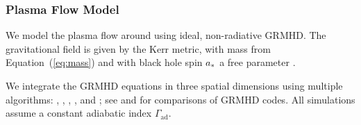 \subsubsection{Plasma Flow Model}

We model the plasma flow around \sgra using ideal, non-radiative GRMHD.
The gravitational field is given by the Kerr metric, with mass from Equation~(\ref{eq:mass}) and with black hole spin $a_*$ a free parameter \citep[see e.g.,][]{2003ApJ...589..444G, 2005ApJ...635..723A, 2007A&A...473...11D}.

We integrate the GRMHD equations in three spatial dimensions using multiple algorithms:
\kharma   \citep{2021JOSS....6.3336P},
\bhac     \citep{2017ComAC...4....1P},
\hamr     \citep{Liska2018},
\koral    \citep{2013MNRAS.429.3533S}, and
\athenapp \citep{2016ApJS..225...22W};
see \citet{2019ApJS..243...26P} and \citet{Olivares_et_al} for comparisons of GRMHD codes.
All simulations assume a constant adiabatic index $\Gamma_\mathrm{ad}$.

